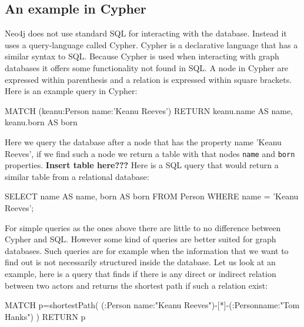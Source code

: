\subsection{An example in Cypher}
Neo4j does not use standard SQL for interacting with the database. Instead it uses a query-language called Cypher. Cypher is a declarative language that has a similar syntax to SQL. Because Cypher is used when interacting with graph databases it offers some functionality not found in SQL. A node in Cypher are expressed within parenthesis and a relation is expressed within square brackets. Here is an example query in Cypher: 
\begin{sqlCode}
MATCH (keanu:Person {name:'Keanu Reeves'})
RETURN keanu.name AS name, keanu.born AS born
\end{sqlCode}
Here we query the database after a node that has the property name 'Keanu Reeves', if we find such a node we return a table with that nodes \texttt{name} and \texttt{born} properties. \textbf{Insert table here???} Here is a SQL query that would return a similar table from a relational database:
\begin{sqlCode}
SELECT 
    name AS name, 
    born AS born
FROM 
    Person
WHERE 
    name = 'Keanu Reeves';
\end{sqlCode}

For simple queries as the ones above there are little to no difference between Cypher and SQL. However some kind of queries are better suited for graph databases. Such queries are for example when the information that we want to find out is not necessarily structured inside the database. Let us look at an example, here is a query that finds if there is any direct or indirect relation between two actors and returns the shortest path if such a relation exist:

\begin{sqlCode}
MATCH p=shortestPath(
(:Person {name:"Keanu Reeves"})-[*]-(:Person{name:"Tom Hanks"})
) RETURN p
\end{sqlCode}

